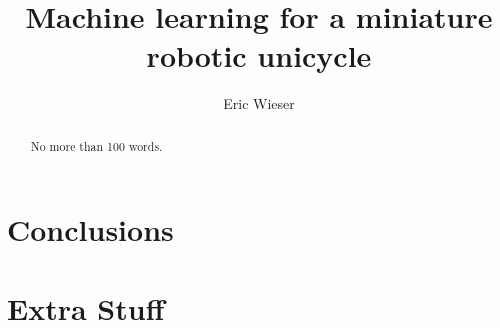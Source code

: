 \documentclass[12pt,a4paper]{IIBproject}
\begin{document}


	\author{Eric Wieser}
	\title{Machine learning for a miniature robotic unicycle}
	\maketitle
	\thispagestyle{empty}



	\begin{abstract}
	No more than 100 words.
	\end{abstract}
	\pagestyle{plain}
	\tableofcontents
	\newpage

	\clearpage
	


	\clearpage
	

	\clearpage
	

	\clearpage
	



	\section{Conclusions}

	\printbibliography

	\appendix

	\section{Extra Stuff}
\end{document}
